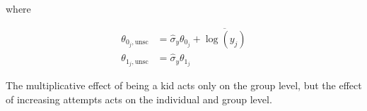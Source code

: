 \documentclass[11pt,a4paper]{article}
\begin{document}
where
\begin{linenomath}
\begin{align*}
\theta_{0_j,\text{unsc}} &= \hat{\sigma}_y \theta_{0_j} + \overline{\log(y_j)} \\
\theta_{1_j,\text{unsc}} &= \hat{\sigma}_y \theta_{1_j}
\end{align*}
\end{linenomath}
The multiplicative effect of being a kid acts only on the group level, but the effect of increasing attempts acts on the individual and group level.
\end{document}
